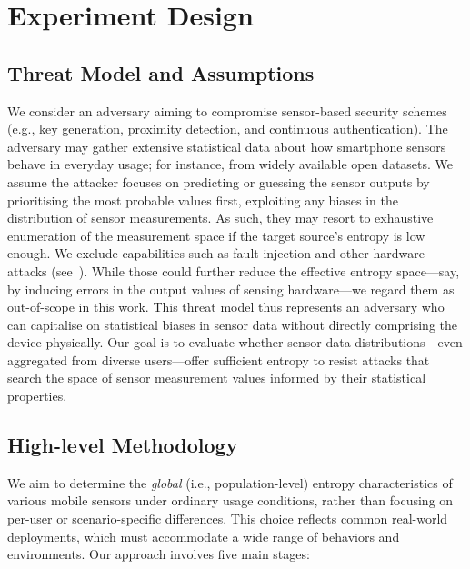 \section{Experiment Design}
\label{sec:design}


\subsection{Threat Model and Assumptions}

We consider an adversary aiming to compromise sensor-based security schemes (e.g., key generation, proximity detection, and continuous authentication). The adversary may gather extensive statistical data about how smartphone sensors behave in everyday usage; for instance, from widely available open datasets. We assume the attacker focuses on predicting or guessing the sensor outputs by prioritising the most probable values first, exploiting any biases in the distribution of sensor measurements. As such, they may resort to exhaustive enumeration of the measurement space if the target source's entropy is low enough.
We exclude capabilities such as fault injection and other hardware attacks (see~\cite{shepherd2021physical}). While those could further reduce the effective entropy space---say, by inducing errors in the output values of sensing hardware---we regard them as out-of-scope in this work. This threat model thus represents an adversary who can capitalise on statistical biases in sensor data without directly comprising the device physically. Our goal is to evaluate whether sensor data distributions---even aggregated from diverse users---offer sufficient entropy to resist attacks that search the space of sensor measurement values informed by their statistical properties.

\subsection{High-level Methodology}

We aim to determine the \emph{global} (i.e., population-level) entropy characteristics of various mobile sensors under ordinary usage conditions, rather than focusing on per-user or scenario-specific differences. This choice reflects common real-world deployments, which must accommodate a wide range of behaviors and environments. Our approach involves five main stages:

